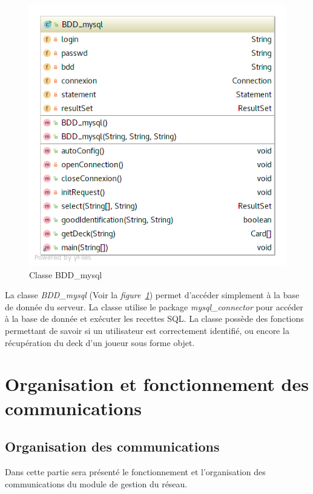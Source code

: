 \documentclass[a4paper,11pt]{report}
\begin{document}
  \begin{figure}[th]
      \begin{center}
        \includegraphics[scale=0.4]{Assets/UML_BDD.png}
        \caption{Classe BDD\_mysql}
        \label{Classe BDD_mysql}
      \end{center}
    \end{figure}
    
    La classe \textit{BDD\_mysql} (Voir la \textit{figure~\ref{Classe BDD_mysql}}) permet d’accéder simplement à la base de donnée du serveur. La classe utilise le package \textit{mysql\_connector} pour accéder à la base de donnée et exécuter les recettes SQL. La classe possède des fonctions permettant de savoir si un utilisateur est correctement identifié, ou encore la récupération du deck d’un joueur sous forme objet.




\section{Organisation et fonctionnement des communications}

\subsection{Organisation des communications}
Dans cette partie sera présenté le fonctionnement et l’organisation des communications du module de gestion du réseau.
\end{document}
